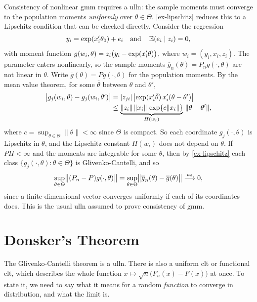 \documentclass[a4paper,12pt]{article}
\begin{document}
\begin{example}\label{ex-gmm}
	Consistency of nonlinear \gls{gmm} requires a \gls{ulln}:
	the sample moments must converge to the population moments \emph{uniformly} over $\theta\in\Theta$.
	\autoref{ex-lipschitz} reduces this to a Lipschitz condition that can be checked directly.
	Consider the regression
	\begin{align}
		y_i=\exp(x_i^{\prime}\theta_0)+e_i
		\quad\text{and}\quad
		\operatorname{\mathbb{E}}(e_i\mid z_i)=0,
	\end{align}
	with moment function $g(w_i,\theta)=z_i\bigl(y_i-\exp(x_i^{\prime}\theta)\bigr)$, where $w_i=(y_i,x_i,z_i)$.
	The parameter enters nonlinearly, so the sample moments $\overline g_n(\theta)=P_n g(\cdot,\theta)$
	are not linear in $\theta$.
	Write $\overline g(\theta)=P g(\cdot,\theta)$ for the population moments.
	By the mean value theorem, for some $\bar\theta$ between $\theta$ and $\theta'$,
	\begin{align}
		\bigl|g_j(w_i,\theta)-g_j(w_i,\theta')\bigr|
		&=|z_{ji}|\,\bigl|\exp(x_i^{\prime}\bar\theta)\,x_i^{\prime}(\theta-\theta')\bigr| \\
		&\le\underbrace{\|z_i\|\,\|x_i\|\,\exp\{c\|x_i\|\}}_{H(w_i)}\,\|\theta-\theta'\|,
	\end{align}
	where $c=\sup_{\theta\in\Theta}\|\theta\|<\infty$ since $\Theta$ is compact.
	So each coordinate $g_j(\cdot,\theta)$ is Lipschitz in $\theta$, and the Lipschitz constant $H(w_i)$ does not depend on $\theta$.
	If $PH<\infty$ and the moments are integrable for some $\theta$,
	then by \autoref{ex-lipschitz} each class $\{g_j(\cdot,\theta):\theta\in\Theta\}$ is Glivenko-Cantelli, and so
	\begin{align}
		\sup_{\theta\in\Theta}\bigl\|(P_n-P)g(\cdot,\theta)\bigr\|
		= \sup_{\theta\in\Theta}\bigl\|\overline g_n(\theta) - \overline g(\theta)\bigr\|\overset{as}{\longrightarrow}0,
	\end{align}
	since a finite-dimensional vector converges uniformly if each of its coordinates does.
	This is the usual \gls{ulln} assumed to prove consistency of \gls{gmm}.
\end{example}

\section{Donsker's Theorem}

The Glivenko-Cantelli theorem is a \gls{ulln}.
There is also a uniform \gls{clt} or functional \gls{clt},
which describes the whole function $x\mapsto\sqrt n\bigl(F_n(x)-F(x)\bigr)$ at once.
To state it, we need to say what it means for a random \emph{function} to converge in distribution, and what the limit is.
\end{document}
